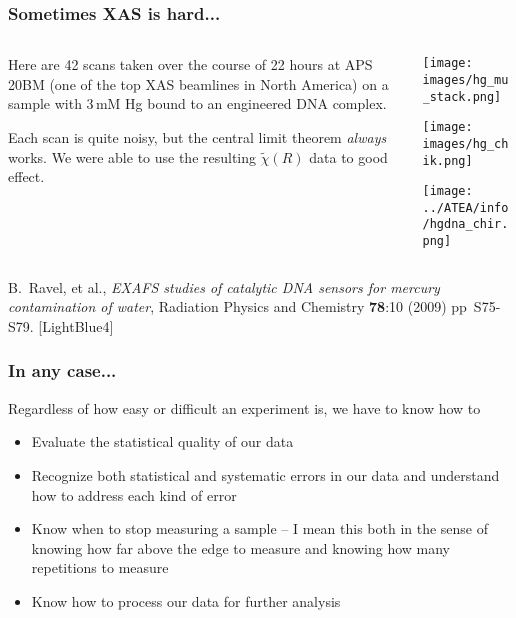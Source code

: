 \documentclass[10pt, xcolor=x11names, compress]{beamer}
\begin{document}
\begin{frame}
  \frametitle{Sometimes XAS is hard...}
  \begin{columns}
    \begin{column}{0.60\linewidth}
      Here are 42 scans taken over the course of 22 hours at APS 20BM
      (one of the top XAS beamlines in North America) on a sample with
      3\,mM Hg bound to an engineered DNA complex.

      \medskip

      Each scan is quite noisy, but the central limit theorem
      \textit{always} works.  We were able to use the resulting
      $\tilde\chi(R)$ data to good effect.
    \end{column}
    \begin{column}{0.36\linewidth}
      \texttt{[image: images/hg\_mu\_stack.png]}

      \texttt{[image: images/hg\_chik.png]}      

      \texttt{[image: ../ATEA/info/hgdna\_chir.png]}
    \end{column}
  \end{columns}
  \begin{bottomnote}[0.4][18.0]
    B.\ Ravel, et al., \textit{EXAFS studies of catalytic DNA sensors
      for mercury contamination of water}, Radiation Physics and
    Chemistry \textbf{78}:10 (2009) pp\ S75-S79.
    [LightBlue4]
  \end{bottomnote}
\end{frame}

\begin{frame}
  \frametitle{In any case...}
  Regardless of how easy or difficult an experiment is, we have to
  know how to
  \begin{itemize}
  \item<1-> Evaluate the statistical quality of our data
  \item<2-> Recognize both statistical and systematic errors in our data
    and understand how to address each kind of error
  \item<3-> Know when to stop measuring a sample -- I mean this both in
    the sense of knowing how far above the edge to measure and knowing
    how many repetitions to measure
  \item<4-> Know how to process our data for further analysis
  \end{itemize}
\end{frame}
\end{document}
